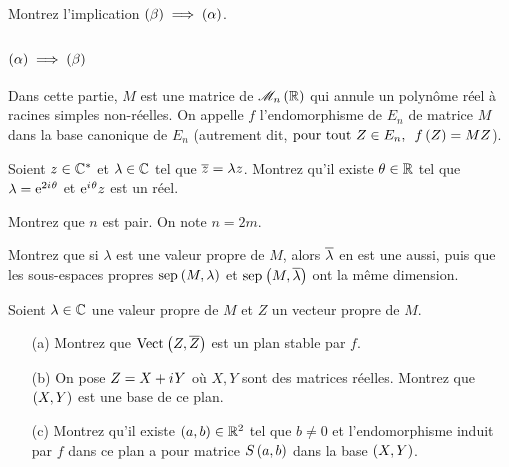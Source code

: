 \begin{q}
Montrez l'implication \(\left(\beta\right)\implies\left(\alpha\right)\).
\end{q}



\subsection*{\(\left(\alpha\right)\implies\left(\beta\right)\)}

Dans cette partie, \(M\) est une matrice de \(\M{n}[\R]\) qui annule un polynôme réel à racines simples non-réelles. On appelle \(f\) l'endomorphisme de \(E_n\) de matrice \(M\) dans la base canonique de \(E_n\) (autrement dit, \(\quantifs{\tpt Z\in E_n}f\paren{Z}=MZ\)).

\begin{q}
Soient \(z\in\mathbb{C}^*\) et \(\lambda\in\mathbb{C}\) tel que \(\overline{z}=\lambda z\). Montrez qu'il existe \(\theta\in\mathbb{R}\) tel que \(\lambda=\mathrm{e}^{2i\mkern1mu\theta}\) et \(\mathrm{e}^{i\mkern1mu\theta}z\) est un réel.
\end{q}



\begin{q}
Montrez que \(n\) est pair. On note \(n=2m\).
\end{q}



\begin{q}
Montrez que si \(\lambda\) est une valeur propre de \(M\), alors \(\overline{\lambda}\) en est une aussi, puis que les sous-espaces propres \(\sep{M}{\lambda}\) et \(\sep{M}{\conj{\lambda}}\) ont la même dimension.
\end{q}



\begin{q}
Soient \(\lambda\in\mathbb{C}\) une valeur propre de \(M\) et \(Z\) un vecteur propre de \(M\).

\begin{enumerate}
    \item[(a)] Montrez que \(\Vect{Z,\conj{Z}}\) est un plan stable par \(f\). \\
    \item[(b)] On pose \(Z=X+i\mkern1mu Y\) où \(X,Y\) sont des matrices réelles. Montrez que \(\left(X,Y\right)\) est une base de ce plan. \\
    \item[(c)] Montrez qu'il existe \(\left(a,b\right)\in\mathbb{R}^2\) tel que \(b\not=0\) et l'endomorphisme induit par \(f\) dans ce plan a pour matrice \(S\left(a,b\right)\) dans la base \(\left(X,Y\right)\).
\end{enumerate}
\end{q}



